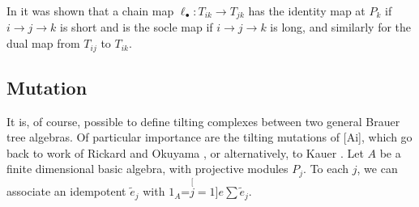 \documentclass[11pt,english]{article}
\numberwithin{figure}{section}
\numberwithin{equation}{section}
\numberwithin{table}{section}
\theoremstyle{definition}
\theoremstyle{remark}
\begin{document}
\noindent In \cite{SZ1} it was shown  that  
a chain map $\ell_\bullet:T_{ik} \rightarrow T_{jk}$  has the identity map at $P_k$
if  $i \rightarrow j \rightarrow k$ is short and is the socle map if
$i\rightarrow j \rightarrow k$ is long, and similarly for the dual
map from  $T_{ij}$ to $T_{ik}$.

\subsection{Mutation}

\noindent It is, of course, possible to define tilting complexes between
two general Brauer tree algebras. Of particular importance are the
tilting mutations of {[}Ai{]}, which go back to work of Rickard \cite{R2} and
Okuyama \cite{O}, or alternatively, to Kauer \cite{Ka}. Let $A$ be a finite dimensional basic algebra, with projective modules $P_j$. To each $j$,
we can associate an idempotent $\tilde{e}_{j}$ with $1_{A}$=$\stackrel[j=1]{e}{\sum}$$\tilde{e}_{j}$.
\end{document}
